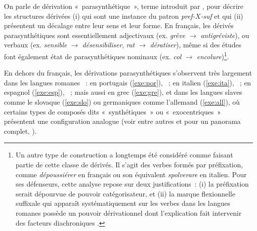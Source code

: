 \documentclass[output=paper]{langsci/langscibook}
\begin{document}
On parle de dérivation «~parasynthétique~», terme  introduit par \citet{darmesteter1875.traite-formation,Darmesteter1877}, pour décrire les structures dérivées (i) qui   sont une instance du patron \emph{\mbox{pref-$X$-suf}} et  qui (ii) présentent un décalage entre leur sens et leur forme.
 En français, les dérivés parasynthétiques sont essentiellement adjectivaux (ex.
\emph{grève} $\rightarrow$ \emph{antigréviste}),
 ou verbaux (ex. \emph{sensible} $\rightarrow$ \emph{désensibiliser}, \emph{rat} $\rightarrow$ \emph{dératiser}), même si des études font également état de parasynthétiques nominaux (ex. \emph{col} $\rightarrow$ \emph{encolure})\footnote{Un autre type de construction a longtemps été considéré comme faisant partie de cette classe de dérivés. Il s'agit des verbes formés par préfixation, comme \emph{dépoussiérer} en français ou son équivalent \emph{spolverare} en italien. Pour ses défenseurs,  cette analyse repose sur deux justifications~: (i) la préfixation serait dépourvue de pouvoir catégorisateur, et (ii) la marque flexionnelle suffixale qui apparaît systématiquement sur les verbes dans les langues romanes possède un pouvoir dérivationnel dont l'explication fait intervenir des facteurs diachroniques \citep{crocco-galeas1993.parasintesi,iacobini2010.parasynthetiques,acedo-matellan2009.diagnostic}.}.

En dehors du français, les dérivations parasynthétiques s'observent très largement dans les langues romanes \citep{reinheimer-ripeanu1974.parasynth,serrano2015.paras-roman}~: en portugais (\ref{exe:por}), \citep{basilio1991.teoria-lexical}~; en italien (\ref{exe:ita}), \citep{guevara2007.IGG23,iacobini2004.parasintesi,melloni2010.paras,scalise1994.morfol}~; en espagnol (\ref{exe:esp}), \citep{serrano1995.parasinteticas,schroten1997.denom-paras}~; mais aussi en grec (\ref{exe:gre}), \citep{efthymiou2014.paras} et dans les langues slaves comme le slovaque (\ref{exe:slo}) ou germaniques comme l'allemand (\ref{exe:all}), où certains types de composés dits «~synthétiques~» ou «~exocentriques~» présentent une configuration analogue (voir entre autres \citet{neef2015.synth-compoun-german,gaeta2010.synth-compounds,crocco-galeas2003.compound-adj,Chovanov2010} et pour un panorama  complet, \citet{lieber2009.handbook-compoun}).
\end{document}
